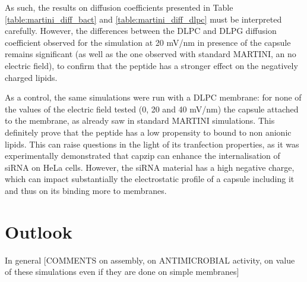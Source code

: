 As such, the results on diffusion coefficients presented in Table \ref{table:martini_diff_bact} and \ref{table:martini_diff_dlpc} must be interpreted carefully. However, the differences between the DLPC and DLPG diffusion coefficient observed for the simulation at 20 mV/nm in presence of the capsule remains significant (as well as the one observed with standard MARTINI, an no electric field), to confirm that the peptide has a stronger effect on the negatively charged lipids.

As a control, the same simulations were run with a DLPC membrane: for none of the values of the electric field tested (0, 20 and 40 mV/nm) the capsule attached to the membrane, as already saw in standard MARTINI simulations.
%
This definitely prove that the peptide has a low propensity to bound to non anionic lipids. This can raise questions in the light of its tranfection properties, as it was experimentally demonstrated that capzip can enhance the internalisation of siRNA on HeLa cells. However, the siRNA material has a high negative charge, which can impact substantially the electrostatic profile of a capsule including it and thus on its binding more to membranes.


\section{Outlook}
In general [COMMENTS on assembly, on ANTIMICROBIAL activity, on value of these simulations even if they are done on simple membranes]

\clearpage


